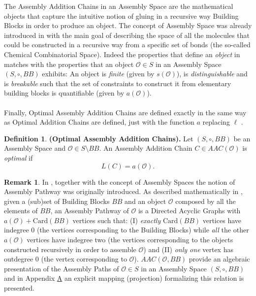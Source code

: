 \documentclass[letterpaper,12pt]{article}
\theoremstyle{definition}
\newtheorem{definition}{Definition}
\newtheorem{remark}{Remark}
\begin{document}
The Assembly Addition Chains in an Assembly Space are the mathematical objects that capture the intuitive notion of gluing in a recursive way Building Blocks in order to produce an object. The concept of Assembly Space was already introduced in \cite{Sharma2023AssemblyTE} with the main goal of describing the space of all the molecules that could be constructed in a recursive way from a specific set of bonds (the so-called Chemical Combinatorial Space). Indeed the properties that define an \textit{object} in \cite{Sharma2023AssemblyTE} matches with the properties that an object $\mathscr{O} \in S$ in an Assembly Space $(S,\circ,BB)$ exhibits: An object is \textit{finite} (given by $s(\mathscr{O})$), is \textit{distinguishable} and is \textit{breakable} such that the set of constraints to construct it from elementary building blocks is quantifiable (given by $a(\mathscr{O})$). \\\\
Finally, Optimal Assembly Addition Chains are defined exactly in the same way as Optimal Addition Chains are defined, just with the function $a$ replacing $\ell$ . 
\begin{definition} \textbf{(Optimal Assembly Addition Chains).} Let $(S,\circ,BB)$ be an Assembly Space and $\mathscr{O} \in S \setminus BB$. An Assembly Addition Chain $C \in AAC(\mathscr{O})$ is \textit{optimal} if 
\begin{equation}
    L(C)= a(\mathscr{O}).
\end{equation}
\end{definition}
    
\begin{remark}\label{impremark}
In \cite{Marshall2022FormalisingTP}, together with the concept of Assembly Spaces the notion of Assembly Pathway was originally introduced. As described mathematically in \cite{Marshall2022FormalisingTP}, given a (sub)set of Building Blocks $BB$ and an object $\mathscr{O}$ composed by all the elements of $BB$, an Assembly Pathway of $\mathscr{O}$ is a Directed Acyclic Graphs with $a(\mathscr{O})+\text{Card}(BB)$ vertices such that: (I) \textit{exactly} $\text{Card}(BB)$ vertices have indegree $0$ (the vertices corresponding to the Building Blocks) while \textit{all} the other $a(\mathscr{O})$ vertices have indegree two (the vertices corresponding to the objects constructed recursively in order to assemble $\mathscr{O}$) and (II) \textit{only one} vertex has outdegree $0$ (the vertex corresponding to $\mathscr{O}$). $AAC(\mathscr{O},BB)$ provide an algebraic presentation of the Assembly Paths of $\mathscr{O} \in S$ in an Assembly Space $(S,\circ,BB)$ and in Appendix \href{AppA}{A} an explicit mapping (projection) formalizing this relation is presented.
\end{remark}
\end{document}
